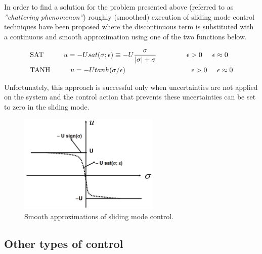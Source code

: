 \documentclass{thesisreport}
\begin{document}
In order to find a solution for the problem presented above (referred to as \textit{”chattering phenomenon”}) roughly (smoothed) execution of sliding mode control techniques have been proposed where the discontinuous  term is substituted with a  continuous and smooth approximation using one of the two functions below.


\begin{equation}
\begin{aligned}
&\text{SAT} \text{\hspace{1cm}} u=-U sat(\sigma; \epsilon) \equiv -U \frac{\sigma}{|\sigma| + \sigma} \text{\hspace{1.5cm}} \epsilon >0 \text{\hspace{0.5cm}} \epsilon \approx 0 \\
&\text{TANH} \text{\hspace{1cm}} u=-U tanh(\sigma/ \epsilon)  \text{\hspace{3.3cm}} \epsilon >0 \text{\hspace{0.5cm}} \epsilon \approx 0  \\
\end{aligned}
\end{equation}

Unfortunately, this approach is successful only when uncertainties are not applied on the system and the control action that prevents these uncertainties can be set to zero in the sliding mode.


\begin{figure}[h]
\centering
\includegraphics[width=0.6\textwidth]{Images/Control/first_order_sliding_mode_control_c}
\caption{Smooth approximations of sliding mode control.}
\label{Smooth_Sliding_mode_control}
\end{figure}


 
 \subsection{Other types of control}
 
\end{document}
